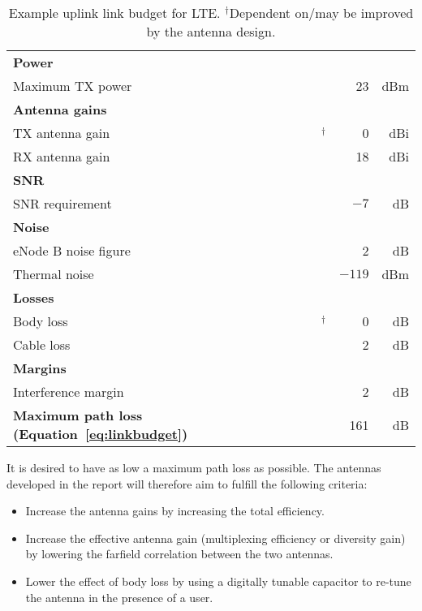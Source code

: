 \def\MARK{$^{\dagger}$\xspace}
\begin{table}[htbp]
    \centering
    \begin{tabular}{|l|c|r|r|}
        \hline
        \textbf{Power}         &                     &        &     \\
        Maximum TX power       & \cite{holma2011lte} & 23     & dBm \\
        \hline
        \textbf{Antenna gains} &                     &        &     \\
        TX antenna gain        & \MARK               & 0      & dBi \\
        RX antenna gain        & \cite{holma2011lte} & 18     & dBi \\
        \hline
        \textbf{SNR}           &                     &        &     \\
        SNR requirement        & \cite{holma2011lte} & $-7$   & dB  \\
        \hline
        \textbf{Noise}         &                     &        &     \\
        eNode B noise figure   & \cite{holma2011lte} & 2      & dB  \\
        Thermal noise          & \cite{holma2011lte} & $-119$ & dBm \\
        \hline
        \textbf{Losses}        &                     &        &     \\
        Body loss              & \MARK               & 0      & dB  \\
        Cable loss             & \cite{holma2011lte} & 2      & dB  \\
        \hline
        \textbf{Margins}       &                     &        &     \\
        Interference margin    & \cite{holma2011lte} & 2      & dB  \\
        \hline
        \textbf{Maximum path loss (Equation~\ref{eq:linkbudget})} & & 161    & dB  \\
        \hline
    \end{tabular}
    \caption{Example uplink link budget for LTE. \MARK{}Dependent on/may be improved by the antenna design.}
    \label{tab:linkbudget}
\end{table}

It is desired to have as low a maximum path loss as possible. The antennas developed in the report will therefore aim to fulfill the following criteria:
\begin{itemize}
    \item Increase the antenna gains by increasing the total efficiency.
    \item Increase the effective antenna gain (multiplexing efficiency or diversity gain) by lowering the farfield correlation between the two antennas.
    \item Lower the effect of body loss by using a digitally tunable capacitor to re-tune the antenna in the presence of a user.
\end{itemize}

